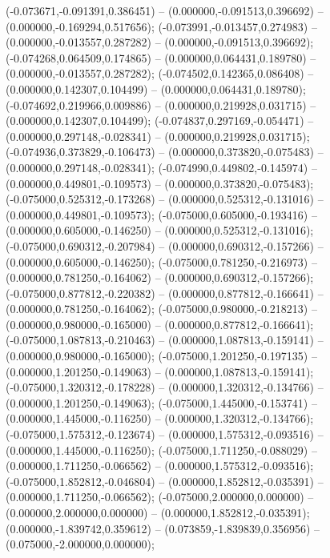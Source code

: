  (-0.073671,-0.091391,0.386451) -- (0.000000,-0.091513,0.396692) -- (0.000000,-0.169294,0.517656);
 (-0.073991,-0.013457,0.274983) -- (0.000000,-0.013557,0.287282) -- (0.000000,-0.091513,0.396692);
 (-0.074268,0.064509,0.174865) -- (0.000000,0.064431,0.189780) -- (0.000000,-0.013557,0.287282);
 (-0.074502,0.142365,0.086408) -- (0.000000,0.142307,0.104499) -- (0.000000,0.064431,0.189780);
 (-0.074692,0.219966,0.009886) -- (0.000000,0.219928,0.031715) -- (0.000000,0.142307,0.104499);
 (-0.074837,0.297169,-0.054471) -- (0.000000,0.297148,-0.028341) -- (0.000000,0.219928,0.031715);
 (-0.074936,0.373829,-0.106473) -- (0.000000,0.373820,-0.075483) -- (0.000000,0.297148,-0.028341);
 (-0.074990,0.449802,-0.145974) -- (0.000000,0.449801,-0.109573) -- (0.000000,0.373820,-0.075483);
 (-0.075000,0.525312,-0.173268) -- (0.000000,0.525312,-0.131016) -- (0.000000,0.449801,-0.109573);
 (-0.075000,0.605000,-0.193416) -- (0.000000,0.605000,-0.146250) -- (0.000000,0.525312,-0.131016);
 (-0.075000,0.690312,-0.207984) -- (0.000000,0.690312,-0.157266) -- (0.000000,0.605000,-0.146250);
 (-0.075000,0.781250,-0.216973) -- (0.000000,0.781250,-0.164062) -- (0.000000,0.690312,-0.157266);
 (-0.075000,0.877812,-0.220382) -- (0.000000,0.877812,-0.166641) -- (0.000000,0.781250,-0.164062);
 (-0.075000,0.980000,-0.218213) -- (0.000000,0.980000,-0.165000) -- (0.000000,0.877812,-0.166641);
 (-0.075000,1.087813,-0.210463) -- (0.000000,1.087813,-0.159141) -- (0.000000,0.980000,-0.165000);
 (-0.075000,1.201250,-0.197135) -- (0.000000,1.201250,-0.149063) -- (0.000000,1.087813,-0.159141);
 (-0.075000,1.320312,-0.178228) -- (0.000000,1.320312,-0.134766) -- (0.000000,1.201250,-0.149063);
 (-0.075000,1.445000,-0.153741) -- (0.000000,1.445000,-0.116250) -- (0.000000,1.320312,-0.134766);
 (-0.075000,1.575312,-0.123674) -- (0.000000,1.575312,-0.093516) -- (0.000000,1.445000,-0.116250);
 (-0.075000,1.711250,-0.088029) -- (0.000000,1.711250,-0.066562) -- (0.000000,1.575312,-0.093516);
 (-0.075000,1.852812,-0.046804) -- (0.000000,1.852812,-0.035391) -- (0.000000,1.711250,-0.066562);
 (-0.075000,2.000000,0.000000) -- (0.000000,2.000000,0.000000) -- (0.000000,1.852812,-0.035391);
 (0.000000,-1.839742,0.359612) -- (0.073859,-1.839839,0.356956) -- (0.075000,-2.000000,0.000000);
